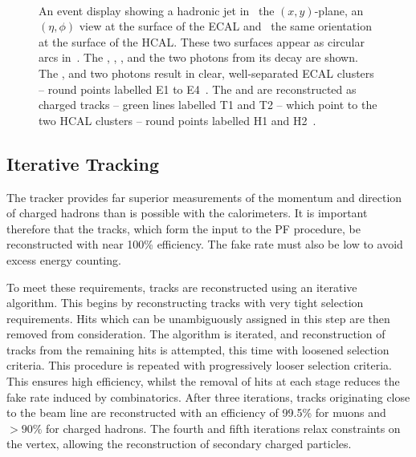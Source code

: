 \begin{figure}[h!]
\centering
{}\\
\quad
{}
\caption[\ac{PF} event display showing a hadronic jet]{An event display showing
  a hadronic jet in~ the $(x,y)$-plane,
   an $(\eta,\phi)$ view at the surface of the
  \ac{ECAL} and~ the same orientation at the surface
  of the \ac{HCAL}. These two surfaces appear as circular arcs
  in~. The \PKlong, \Ppiminus, \Ppiplus, \Ppizero and
  the two photons from its decay are shown. The \PKlong, \Ppiminus and two
  photons result in clear, well-separated \ac{ECAL} clusters -- round points
  labelled E1 to E4~. The \Ppiplus and \Ppiminus are
  reconstructed as charged tracks -- green lines labelled T1 and T2 -- which
  point to the two \ac{HCAL} clusters -- round points labelled H1 and
  H2~\cite{cms_pf_pas}.}
\label{fig:reco_pf_diag}
\end{figure}

\subsection{Iterative Tracking}
The tracker provides far superior measurements of the momentum and direction of
charged hadrons than is possible with the calorimeters. It is important
therefore that the tracks, which form the input to the \ac{PF} procedure, be
reconstructed with near 100\% efficiency. The fake rate must also be low to
avoid excess energy counting.

To meet these requirements, tracks are reconstructed using an iterative
algorithm. This begins by reconstructing tracks with very tight selection
requirements. Hits which can be unambiguously assigned in this step are then
removed from consideration. The algorithm is iterated, and reconstruction of
tracks from the remaining hits is attempted, this time with loosened selection
criteria. This procedure is repeated with progressively looser selection
criteria. This ensures high efficiency, whilst the removal of hits at each stage
reduces the fake rate induced by combinatorics.  After three iterations, tracks
originating close to the beam line are reconstructed with an efficiency of
99.5\% for muons and $>90\%$ for charged hadrons. The fourth and fifth
iterations relax constraints on the vertex, allowing the reconstruction of
secondary charged particles.

